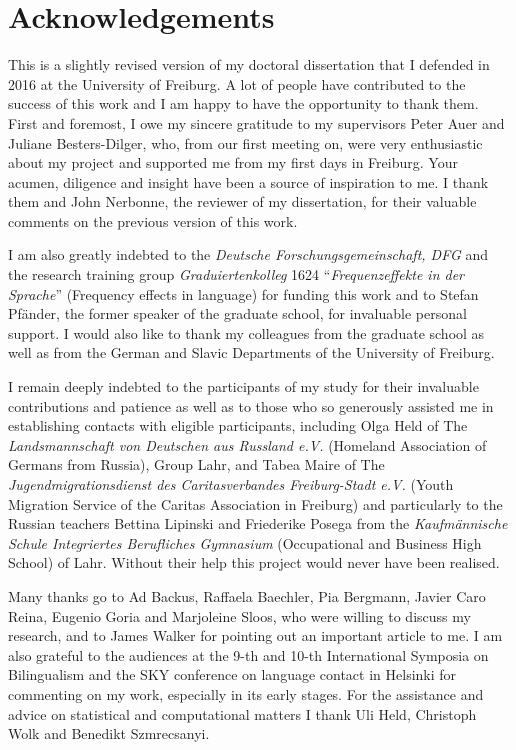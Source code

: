 \chapter*{Acknowledgements}

This is a slightly revised version of my doctoral dissertation that I defended in 2016 at the University of Freiburg. A lot of people have contributed to the success of this work and I am happy to have the opportunity to thank them. First and foremost, I owe my sincere gratitude to my supervisors Peter Auer and Juliane Besters-Dilger, who, from our first meeting on, were very enthusiastic about my project and supported me from my first days in Freiburg. Your acumen, diligence and insight have been a source of inspiration to me. I thank them and John Nerbonne, the reviewer of my dissertation, for their valuable comments on the previous version of this work. 

 I am also greatly indebted to the \textit{Deutsche Forschungsgemeinschaft, DFG} and the research training group \textit{Graduiertenkolleg} 1624 ``\textit{Frequenzeffekte in der Sprache}'' (Frequency effects in language) for funding this work and to Stefan Pfänder, the former speaker of the graduate school, for invaluable personal support. I would also like to thank my colleagues from the graduate school as well as from the German and Slavic Departments of the University of Freiburg.

I remain deeply indebted to the participants of my study for their invaluable contributions and patience as well as to those who so generously assisted me in establishing contacts with eligible participants, including Olga Held of The \textit{Landsmannschaft von Deutschen aus Russland e.V.} (Homeland Association of Germans from Russia), Group Lahr, and Tabea Maire of The \textit{Jugendmigrationsdienst des Caritasverbandes Freiburg-Stadt e.V.} (Youth Migration Service of the Caritas Association in Freiburg) and particularly to the Russian teachers Bettina Lipinski and Friederike Posega from the \textit{Kaufmännische Schule Integriertes Berufliches Gymnasium} (Occupational and Business High School) of Lahr. Without their help this project would never have been realised.

Many thanks go to Ad Backus, Raffaela Baechler, Pia Bergmann, Javier Caro Reina, Eugenio Goria and Marjoleine Sloos, who were willing to discuss my research, and to James Walker for pointing out an important article to me. I am also grateful to the audiences at the 9-th and 10-th International Symposia on Bilingualism and the SKY conference on language contact in Helsinki for commenting on my work, especially in its early stages. For the assistance and advice on statistical and computational matters I thank Uli Held, Christoph Wolk and Benedikt Szmrecsanyi.

